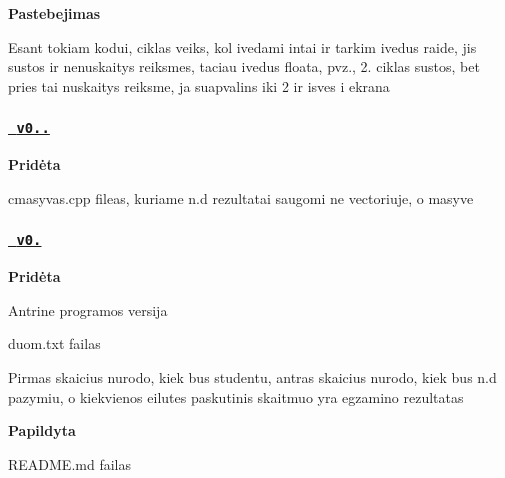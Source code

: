 {\bfseries{Pastebejimas}}

Esant tokiam kodui, ciklas veiks, kol ivedami int\textquotesingle{}ai ir tarkim ivedus raide, jis sustos ir nenuskaitys reiksmes, taciau ivedus float\textquotesingle{}a, pvz., 2. ciklas sustos, bet pries tai nuskaitys reiksme, ja suapvalins iki 2 ir isves i ekrana


\begin{DoxyCode}{0}
\DoxyCodeLine{    \}}
\end{DoxyCode}


\subsubsection*{\href{https://github.com/simassimonas/ObjProg-2uzd/releases/tag/v0.1.1}{\texttt{ v0..}}}

{\bfseries{Pridėta}}
\begin{DoxyItemize}
\item cmasyvas.\+cpp file\textquotesingle{}as, kuriame n.\+d rezultatai saugomi ne vectoriuje, o masyve
\end{DoxyItemize}

\subsubsection*{\href{https://github.com/simassimonas/ObjProg-2uzd/releases/tag/v0.2}{\texttt{ v0.}}}

{\bfseries{Pridėta}}
\begin{DoxyItemize}
\item Antrine programos versija
\item duom.\+txt failas
\end{DoxyItemize}

Pirmas skaicius nurodo, kiek bus studentu, antras skaicius nurodo, kiek bus n.\+d pazymiu, o kiekvienos eilutes paskutinis skaitmuo yra egzamino rezultatas


\begin{DoxyCode}{0}
\end{DoxyCode}


{\bfseries{Papildyta}}
\begin{DoxyItemize}
\item R\+E\+A\+D\+M\+E.\+md failas
\end{DoxyItemize}

